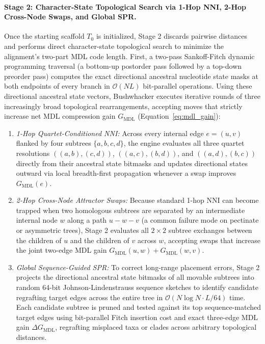 \documentclass[11pt,a4paper]{article}
\begin{document}
\paragraph{Stage 2: Character-State Topological Search via 1-Hop NNI, 2-Hop Cross-Node Swaps, and Global SPR.}
Once the starting scaffold $T_0$ is initialized, Stage 2 discards pairwise distances and performs direct character-state topological search to minimize the alignment's two-part MDL code length. First, a two-pass Sankoff-Fitch dynamic programming traversal \citep{fitch1971toward} (a bottom-up postorder pass followed by a top-down preorder pass) computes the exact directional ancestral nucleotide state masks at both endpoints of every branch in $\mathcal{O}(NL)$ bit-parallel operations. Using these directional ancestral state vectors, Bushwhacker executes iterative rounds of three increasingly broad topological rearrangements, accepting moves that strictly increase net MDL compression gain $G_{\text{MDL}}$ (Equation~\eqref{eq:mdl_gain}):
\begin{enumerate}
    \item \textit{1-Hop Quartet-Conditioned NNI:} Across every internal edge $e = (u,v)$ flanked by four subtrees $\{a, b, c, d\}$, the engine evaluates all three quartet resolutions $((a,b),(c,d))$, $((a,c),(b,d))$, and $((a,d),(b,c))$ directly from their ancestral state bitmasks and updates directional states outward via local breadth-first propagation whenever a swap improves $G_{\text{MDL}}(e)$.
    \item \textit{2-Hop Cross-Node Attractor Swaps:} Because standard 1-hop NNI can become trapped when two homologous subtrees are separated by an intermediate internal node $w$ along a path $u - w - v$ (a common failure mode on pectinate or asymmetric trees), Stage 2 evaluates all $2 \times 2$ subtree exchanges between the children of $u$ and the children of $v$ across $w$, accepting swaps that increase the joint two-edge MDL gain $G_{\text{MDL}}(u,w) + G_{\text{MDL}}(w,v)$.
    \item \textit{Global Sequence-Guided SPR:} To correct long-range placement errors, Stage 2 projects the directional ancestral state bitmasks of all movable subtrees into random 64-bit Johnson-Lindenstrauss sequence sketches to identify candidate regrafting target edges across the entire tree in $\mathcal{O}(N\log N \cdot L / 64)$ time. Each candidate subtree is pruned and tested against its top sequence-matched target edges using bit-parallel Fitch insertion cost and exact three-edge MDL gain $\Delta G_{\text{MDL}}$, regrafting misplaced taxa or clades across arbitrary topological distances.
\end{enumerate}
\end{document}
